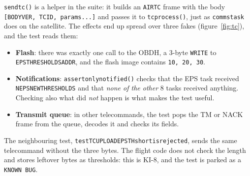 \documentclass[11pt,a4paper]{article}
\DeclareRobustCommand{\_}{\textunderscore\allowbreak}
\newcommand{\cd}[1]{\texttt{#1}}
\begin{document}
\cd{send\_tc()} is a helper in the suite: it builds an \cd{AIR\_TC} frame with the body
\cd{[BODY\_VER, TC\_ID, params...]} and passes it to \cd{tc\_process()}, just as
\cd{comms\_task} does on the satellite. The effects end up spread over three fakes
(figure~\ref{fig:tc}), and the test reads them:
\begin{itemize}
\item \textbf{Flash}: there was exactly one call to the OBDH, a 3-byte \cd{WRITE} to
  \cd{EPS\_THRESHOLDS\_ADDR}, and the flash image contains \cd{10, 20, 30}.
\item \textbf{Notifications}: \cd{assert\_only\_notified()} checks that the EPS task received
  \cd{N\_EPS\_NEW\_THRESHOLDS} and that \emph{none of the other} 8 tasks received anything. Checking
  also what did \emph{not} happen is what makes the test useful.
\item \textbf{Transmit queue}: in other telecommands, the test pops the TM or NACK frame
  from the queue, decodes it and checks its fields.
\end{itemize}

The neighbouring test, \cd{test\_TC\_UPLOAD\_EPS\_TH\_short\_is\_rejected}, sends the same
telecommand without the three bytes. The flight code does not check the length and stores
leftover bytes as thresholds: this is KI-8, and the test is parked as a \cd{KNOWN BUG}.
\end{document}
